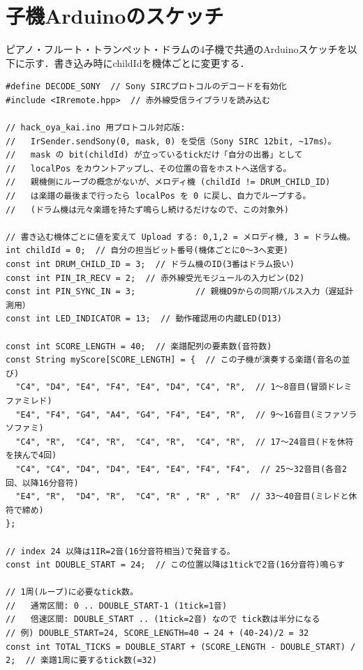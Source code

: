 \documentclass[uplatex,dvipdfmx]{jlreq}
\begin{document}
\section{子機Arduinoのスケッチ}
\label{sec:code-ko}

ピアノ・フルート・トランペット・ドラムの4子機で共通のArduinoスケッチを以下に示す．書き込み時にchildIdを機体ごとに変更する．

\begin{lstlisting}
#define DECODE_SONY  // Sony SIRCプロトコルのデコードを有効化
#include <IRremote.hpp>  // 赤外線受信ライブラリを読み込む

// hack_oya_kai.ino 用プロトコル対応版:
//   IrSender.sendSony(0, mask, 0) を受信（Sony SIRC 12bit, ~17ms）。
//   mask の bit(childId) が立っているtickだけ「自分の出番」として
//   localPos をカウントアップし、その位置の音をホストへ送信する。
//   親機側にループの概念がないが、メロディ機 (childId != DRUM_CHILD_ID)
//   は楽譜の最後まで行ったら localPos を 0 に戻し、自力でループする。
//   (ドラム機は元々楽譜を持たず鳴らし続けるだけなので、この対象外)

// 書き込む機体ごとに値を変えて Upload する: 0,1,2 = メロディ機, 3 = ドラム機。
int childId = 0;  // 自分の担当ビット番号(機体ごとに0〜3へ変更)
const int DRUM_CHILD_ID = 3;  // ドラム機のID(3番はドラム扱い)
const int PIN_IR_RECV = 2;  // 赤外線受光モジュールの入力ピン(D2)
const int PIN_SYNC_IN = 3;            // 親機D9からの同期パルス入力（遅延計測用）
const int LED_INDICATOR = 13;  // 動作確認用の内蔵LED(D13)

const int SCORE_LENGTH = 40;  // 楽譜配列の要素数(音符数)
const String myScore[SCORE_LENGTH] = {  // この子機が演奏する楽譜(音名の並び)
  "C4", "D4", "E4", "F4", "E4", "D4", "C4", "R",  // 1〜8音目(冒頭ドレミファミレド)
  "E4", "F4", "G4", "A4", "G4", "F4", "E4", "R",  // 9〜16音目(ミファソラソファミ)
  "C4", "R",  "C4", "R",  "C4", "R",  "C4", "R",  // 17〜24音目(ドを休符を挟んで4回)
  "C4", "C4", "D4", "D4", "E4", "E4", "F4", "F4",  // 25〜32音目(各音2回、以降16分音符)
  "E4", "R",  "D4", "R",  "C4", "R" , "R" , "R"  // 33〜40音目(ミレドと休符で締め)
};

// index 24 以降は1IR=2音(16分音符相当)で発音する。
const int DOUBLE_START = 24;  // この位置以降は1tickで2音(16分音符)鳴らす

// 1周(ループ)に必要なtick数。
//   通常区間: 0 .. DOUBLE_START-1 (1tick=1音)
//   倍速区間: DOUBLE_START .. (1tick=2音) なので tick数は半分になる
// 例) DOUBLE_START=24, SCORE_LENGTH=40 → 24 + (40-24)/2 = 32
const int TOTAL_TICKS = DOUBLE_START + (SCORE_LENGTH - DOUBLE_START) / 2;  // 楽譜1周に要するtick数(=32)


\end{lstlisting}
\end{document}
